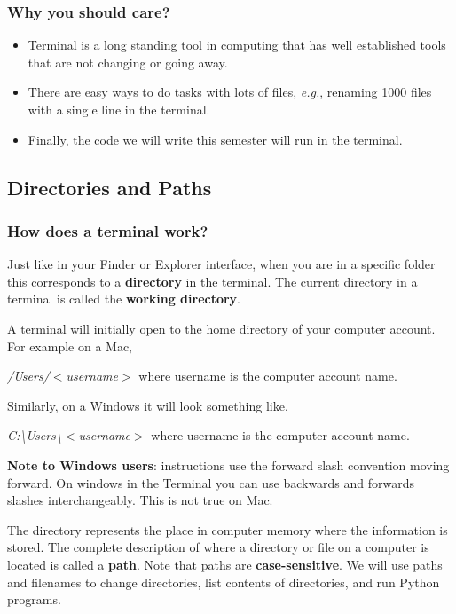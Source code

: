 \documentclass[12pt]{article}
\begin{document}
\subsubsection{Why you should care?}
\begin{itemize}
\item Terminal is a long standing tool in computing that has well established tools that are not changing or going away. 
\item There are easy ways to do tasks with lots of files, \textit{e.g.}, renaming 1000 files with a single line in the terminal.
\item Finally, the code we will write this semester will run in the terminal.
\end{itemize}


\subsection{Directories and Paths}
\subsubsection{How does a terminal work?}

Just like in your Finder or Explorer interface, when you are in a specific folder this corresponds to a \textbf{directory} in the terminal.
The current directory in a terminal is called the \textbf{working directory}.

A terminal will initially open to the home directory of your computer account.
For example on a Mac,

\vspace{5mm}
\textit{/Users/$<$username$>$}
\vspace{5mm}
where username is the computer account name.

Similarly, on a Windows it will look something like,

\vspace{5mm}
\textit{C:\textbackslash Users\textbackslash $<$username$>$}
\vspace{5mm}
where username is the computer account name.

\textbf{Note to Windows users}: instructions use the forward slash convention moving forward. On windows in the Terminal you can use backwards and forwards slashes interchangeably. This is not true on Mac. 

The directory represents the place in computer memory where the information is stored.
The complete description of where a directory or file on a computer is located is called a \textbf{path}.
Note that paths are \textbf{case-sensitive}. 
We will use paths and filenames to change directories, list contents of directories, and run Python programs. 
\end{document}
